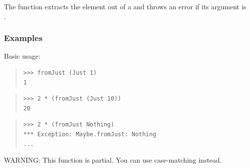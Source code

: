 \begin{haddockdesc}
\item[\begin{tabular}{@{}l}
fromJust :: HasCallStack => Maybe a -> a
\end{tabular}]
{\haddockbegindoc
The  function extracts the element out of a  and
 throws an error if its argument is .\par
\subsubsection*{\textbf{Examples}}
Basic usage:\par
\begin{quote}
{\haddockverb\begin{verbatim}
>>> fromJust (Just 1)
1

\end{verbatim}}
\end{quote}
\begin{quote}
{\haddockverb\begin{verbatim}
>>> 2 * (fromJust (Just 10))
20

\end{verbatim}}
\end{quote}
\begin{quote}
{\haddockverb\begin{verbatim}
>>> 2 * (fromJust Nothing)
*** Exception: Maybe.fromJust: Nothing
...

\end{verbatim}}
\end{quote}
WARNING: This function is partial. You can use case-matching instead.\par}
\end{haddockdesc}
